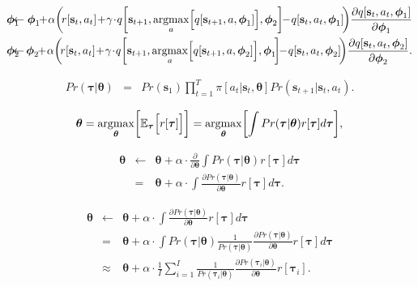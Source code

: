 \documentclass[letterpaper,twoside,openany, titlepage,oldfontcommands,titles,dvipsnames]{memoir}
\begin{document}
\begin{eqnarray}
 \boldsymbol\phi_1\!\!\!&\!\!\leftarrow\!\!\!&\!\!\boldsymbol\phi_1\!\!+\!\alpha \biggl(\!r[\mathbf{s}_t,a_t]\!+\!\gamma \!\cdot\! q\biggl[\mathbf{s}_{t+1},\mathop{\rm argmax}_{a}\Bigl[q[\mathbf{s}_{t+1},a,\boldsymbol\phi_1]\Bigr],\boldsymbol\phi_2\biggr] \!\!-\! q[\mathbf{s}_t,a_t,\boldsymbol\phi_1]\!\biggr)\frac{\partial q[\mathbf{s}_{t},a_{t},\boldsymbol\phi_1]}{\partial \boldsymbol\phi_1}\nonumber \\
 \boldsymbol\phi_2\!\!\!&\!\!\leftarrow\!\!\!&\!\!\boldsymbol\phi_2\!\!+\!\alpha \biggl(\!r[\mathbf{s}_t,a_t]\!+\!\gamma \!\cdot\! q\biggl[\mathbf{s}_{t+1},\mathop{\rm argmax}_{a}\Bigl[q[\mathbf{s}_{t+1},a,\boldsymbol\phi_2]\Bigr],\boldsymbol\phi_1\!\biggr] \!\!-\! q[\mathbf{s}_t,a_t,\boldsymbol\phi_2]\!\biggr)\frac{\partial q[\mathbf{s}_{t},a_{t},\boldsymbol\phi_2]}{\partial \boldsymbol\phi_2}.\nonumber\\
 \end{eqnarray}

\begin{eqnarray}\label{eq:reinforce_path_prob}
 Pr(\boldsymbol\tau|\boldsymbol\theta) &=& Pr(\mathbf{s}_{1})\prod_{t=1}^{T} \pi[a_t|\mathbf{s}_{t},\boldsymbol\theta] Pr(\mathbf{s}_{t+1}|\mathbf{s}_{t},a_{t}).
 \end{eqnarray}

\begin{eqnarray}\label{eq:reinforce_policy_loss}
 \boldsymbol\theta = \mathop{\rm argmax}_{\boldsymbol\theta}\biggl[\mathbb{E}_{\boldsymbol\tau}\Bigl[r[\boldsymbol\tau] \Bigr]\biggr]
  = \mathop{\rm argmax}_{\boldsymbol\theta}\biggl[\int Pr(\boldsymbol\tau|\boldsymbol\theta) r[\boldsymbol\tau] d\boldsymbol\tau\biggr], 
 \end{eqnarray}

\begin{eqnarray}
 \boldsymbol\theta &\leftarrow& \boldsymbol\theta + \alpha\cdot \frac{\partial}{\partial \boldsymbol\theta}\int Pr(\boldsymbol\tau|\boldsymbol\theta) r[\boldsymbol\tau] d\boldsymbol\tau \nonumber \\
  &=& \boldsymbol\theta + \alpha \cdot\int \frac{\partial Pr(\boldsymbol\tau|\boldsymbol\theta)}{\partial \boldsymbol\theta} r[\boldsymbol\tau] d\boldsymbol\tau. 
 \end{eqnarray}

\begin{eqnarray}\label{eq:reinforce_pg_explain}
 \boldsymbol\theta &\leftarrow& \boldsymbol\theta + \alpha \cdot\int \frac{\partial Pr(\boldsymbol\tau|\boldsymbol\theta)}{\partial \boldsymbol\theta} r[\boldsymbol\tau] d\boldsymbol\tau \nonumber \\
 &=& \boldsymbol\theta + \alpha \cdot\int Pr(\boldsymbol\tau|\boldsymbol\theta) \frac{1}{Pr(\boldsymbol\tau|\boldsymbol\theta)} \frac{\partial Pr(\boldsymbol\tau|\boldsymbol\theta)}{\partial \boldsymbol\theta} r[\boldsymbol\tau] d\boldsymbol\tau\nonumber \\
 &\approx & \boldsymbol\theta + \alpha \cdot\frac{1}{I}\sum_{i=1}^{I} \frac{1}{Pr(\boldsymbol\tau_i|\boldsymbol\theta)} \frac{\partial Pr(\boldsymbol\tau_i|\boldsymbol\theta)}{\partial \boldsymbol\theta} r[\boldsymbol\tau_i].
 \end{eqnarray}
\end{document}
